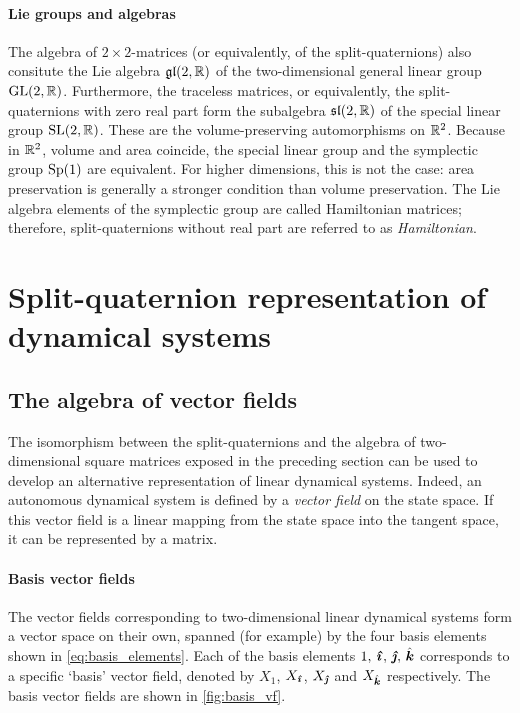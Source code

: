 \paragraph{Lie groups and algebras} 
The algebra of $2\times2$-matrices (or equivalently, of the split-quaternions) also consitute the Lie algebra $\glalg{2}{\real}$ of the two-dimensional general linear group $\glgroup{2}{\real}$. Furthermore, the traceless matrices, or equivalently, the split-quaternions with zero real part form the subalgebra $\slalg{2}{\real}$ of the special linear group $\slgroup{2}{\real}$. These are the volume-preserving automorphisms on $\real^2$. Because in $\real^2$, volume and area coincide, the special linear group and the symplectic group $\spgroup{1}$ are equivalent. For higher dimensions, this is not the case: area preservation is generally a stronger condition than volume preservation. The Lie algebra elements of the symplectic group are called Hamiltonian matrices; therefore, split-quaternions without real part are referred to as \emph{Hamiltonian}.

\section{Split-quaternion representation of dynamical systems}
\label{sec:system_classification}
\subsection{The algebra of vector fields}
\label{ssec:vf_algebra}
The isomorphism between the split-quaternions and the algebra of two-dimensional square matrices exposed in the preceding section can be used to develop an alternative representation of linear dynamical systems. Indeed, an autonomous dynamical system is defined by a \emph{vector field} on the state space. If this vector field is a linear mapping from the state space into the tangent space, it can be represented by a matrix. 

\paragraph{Basis vector fields} The vector fields corresponding to two-dimensional linear dynamical systems form a vector space on their own, spanned (for example) by the four basis elements shown in \cref{eq:basis_elements}. Each of the basis elements $1,\,\quati,\,\quatj,\,\quatk$ corresponds to a specific `basis' vector field, denoted by $X_1$, $X_{\quati}$, $X_{\quatj}$ and $X_{\quatk}$ respectively. The basis vector fields are shown in \cref{fig:basis_vf}. 

